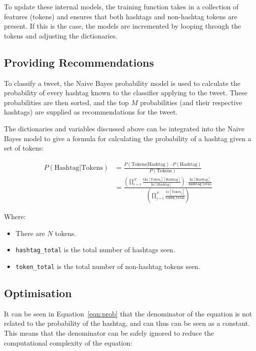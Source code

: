 \documentclass[11pt,a4paper]{report}
\begin{document}
To update these internal models, the training function takes in a collection of features (tokens) and ensures that both hashtags and non-hashtag tokens are present. If this is the case, the models are incremented by looping through the tokens and adjusting the dictionaries.

\subsection{Providing Recommendations}
To classify a tweet, the Naive Bayes probability model is used to calculate the probability of every hashtag known to the classifier applying to the tweet. These probabilities are then sorted, and the top $M$ probabilities (and their respective hashtags) are supplied as recommendations for the tweet.

The dictionaries and variables discussed above can be integrated into the Naive Bayes model to give a formula for calculating the probability of a hashtag given a set of tokens:

\begin{align}
    P(\text{Hashtag}|\text{Tokens}) &= \frac{P(\text{Tokens}|\text{Hashtag}) \cdot P(\text{Hashtag})}{P(\text{Tokens})}\\
                                      &= \frac{\left(\prod\limits_{i=1}^{N} \frac{\mathtt{thc}[\text{Token}_i][\text{Hashtag}]}{\mathtt{hc}[\text{Hashtag}]}\right) \cdot \frac{\mathtt{hc}[\text{Hashtag}]}{\mathtt{hashtag\_total}}}{\left(\prod\limits_{j=1}^{N} \frac{\mathtt{tc}[\text{Token}_j]}{\mathtt{token\_total}}\right)}\label{eqn:prob}
\end{align}

Where:
\begin{itemize}
    \item There are $N$ tokens.
    \item \texttt{hashtag\_total} is the total number of hashtags seen.
    \item \texttt{token\_total} is the total number of non-hashtag tokens seen.
\end{itemize}

\subsection{Optimisation}
\label{ssec:optimisation}
It can be seen in Equation~\ref{eqn:prob} that the denominator of the equation is not related to the probability of the hashtag, and can thus can be seen as a constant. This means that the denominator can be safely ignored to reduce the computational complexity of the equation:
\end{document}
